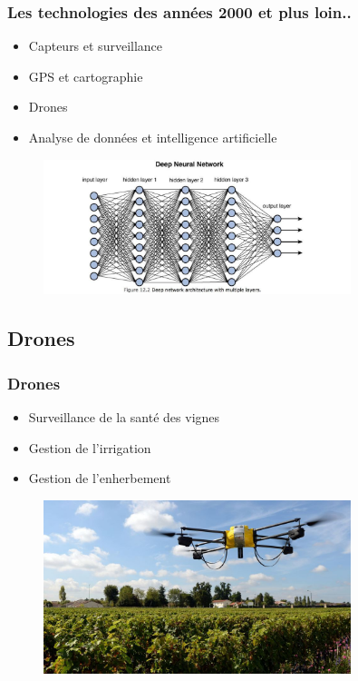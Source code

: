 \documentclass{beamer}
\begin{document}
			\begin{frame}
	\frametitle{Les technologies des années 2000 et plus loin..}
	\begin{itemize}
		\item Capteurs et surveillance
		\item GPS et cartographie
		\item \alert{Drones}
		\item Analyse de données et intelligence artificielle
	\end{itemize}
	
	\begin{figure}
	\includegraphics[width=0.8\textwidth]{neuron}
	\label{fig:example}
\end{figure}
	
\end{frame}

			\subsection{Drones}


		\begin{frame}
		\frametitle{Drones}
		\begin{itemize}
			\item Surveillance de la santé des vignes
			\item Gestion de l'irrigation
			\item Gestion de l'enherbement
		\end{itemize}
		
			\begin{figure}
			\includegraphics[width=0.8\textwidth]{drone}
			\label{fig:example}
		\end{figure}
		
	\end{frame}
\end{document}
